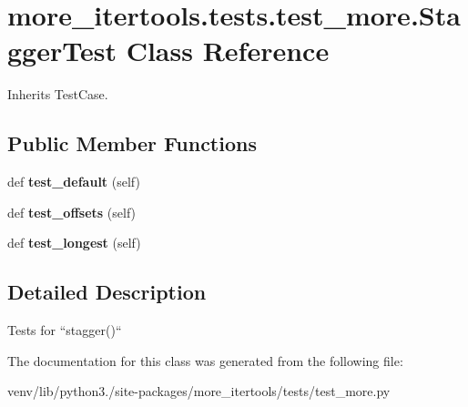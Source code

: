 \hypertarget{classmore__itertools_1_1tests_1_1test__more_1_1_stagger_test}{}\section{more\+\_\+itertools.\+tests.\+test\+\_\+more.\+Stagger\+Test Class Reference}
\label{classmore__itertools_1_1tests_1_1test__more_1_1_stagger_test}


Inherits Test\+Case.

\subsection*{Public Member Functions}
\begin{DoxyCompactItemize}
\item 
\mbox{\label{classmore__itertools_1_1tests_1_1test__more_1_1_stagger_test_af070ab59218d3433360290d23b20bc12}} 
def {\bfseries test\+\_\+default} (self)
\item 
\mbox{\label{classmore__itertools_1_1tests_1_1test__more_1_1_stagger_test_af97de184f60b33a55156ac5a7050d7df}} 
def {\bfseries test\+\_\+offsets} (self)
\item 
\mbox{\label{classmore__itertools_1_1tests_1_1test__more_1_1_stagger_test_ae777ad6b54b55eac6c51bbe658b1ab5e}} 
def {\bfseries test\+\_\+longest} (self)
\end{DoxyCompactItemize}


\subsection{Detailed Description}
\begin{DoxyVerb}Tests for ``stagger()``\end{DoxyVerb}
 

The documentation for this class was generated from the following file\+:\begin{DoxyCompactItemize}
\item 
venv/lib/python3./site-\/packages/more\+\_\+itertools/tests/test\+\_\+more.\+py\end{DoxyCompactItemize}
